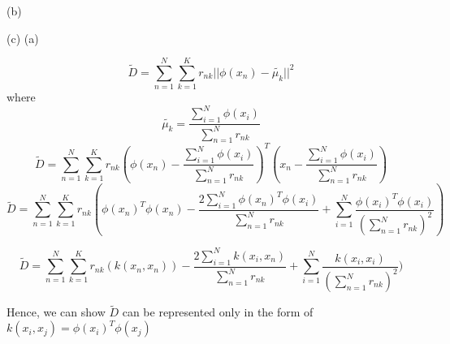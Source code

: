 \documentclass[12pt]{article}
\newenvironment{problem}[2][Problem]{\begin{trivlist}
\item[\hskip \labelsep {\bfseries #1}\hskip \labelsep {\bfseries #2.}]}{\end{trivlist}}
\begin{document}
\begin{problem} 1 (b)
\end{problem}
\begin{Answer}
\end{Answer}

\begin{problem} 1 (c) (a)
\end{problem}
\begin{Answer}
\begin{equation}
    \tilde{D}=\sum_{n=1}^{N}\sum_{k=1}^{K} r_{nk} ||\phi(x_{n}) - \tilde{\mu_{k}}||^2
\end{equation}
where 
\begin{equation}
   \tilde{\mu_{k}} = \frac{\sum_{i=1}^{N} \phi(x_{i})}{\sum_{n=1}^{N} r_{nk}}
\end{equation}
\begin{equation}
   \tilde{D}=\sum_{n=1}^{N}\sum_{k=1}^{K} r_{nk} (\phi(x_{n}) -  \frac{\sum_{i=1}^{N} \phi(x_{i})}{\sum_{n=1}^{N} r_{nk}})^T(x_{n} -  \frac{\sum_{i=1}^{N} \phi(x_{i})}{\sum_{n=1}^{N} r_{nk}})
\end{equation}
\begin{equation}
    \tilde{D}=\sum_{n=1}^{N}\sum_{k=1}^{K} r_{nk}(\phi(x_{n})^T\phi(x_{n}) - \frac{2\sum_{i=1}^{N} \phi(x_{n})^T \phi(x_{i})}{\sum_{n=1}^{N} r_{nk}} + \sum_{i=1}^{N} \frac{\phi(x_{i})^T \phi(x_{i})}{(\sum_{n=1}^{N} r_{nk})^2})
\end{equation}

\begin{equation}
    \tilde{D}=\sum_{n=1}^{N}\sum_{k=1}^{K} r_{nk}(k(x_{n}, x_{n})) - \frac{2\sum_{i=1}^{N} k(x_{i}, x_{n})}{\sum_{n=1}^{N} r_{nk}} + \sum_{i=1}^{N} \frac{k(x_{i}, x_{i})}{(\sum_{n=1}^{N} r_{nk})^2})
\end{equation}

Hence, we can show $\tilde{D}$ can be represented only in the form of $k(x_{i}, x_{j}) = \phi(x_{i})^T \phi(x_{j})$
\end{Answer}
\end{document}
